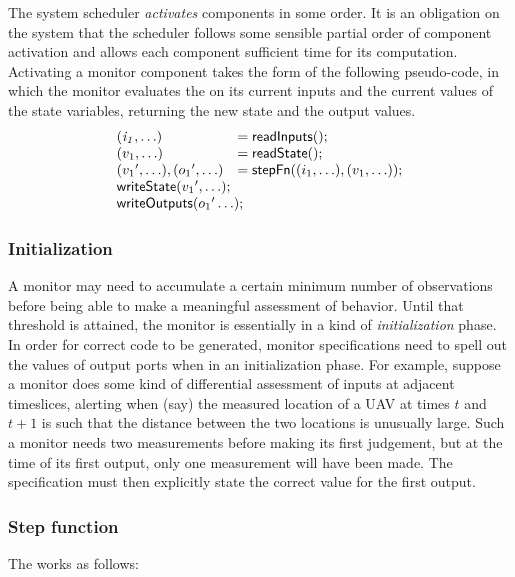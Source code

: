 The system scheduler \emph{activates} components in some order. It is
an obligation on the system that the scheduler follows some sensible
partial order of component activation and allows each component
sufficient time for its computation.  Activating a monitor component
takes the form of the following pseudo-code, in which the monitor
evaluates the  on its current inputs and the current
values of the state variables, returning the new state and the output
values.
\[
\begin{array}{ll}
 \mathit{(i_1,\ldots)} & = \konst{readInputs}(); \\
 (v_1,\ldots) & = \konst{readState}() ; \\
 ({v_1}',\ldots), ({o_1}',\ldots) & = \konst{stepFn} ((i_1,\ldots),(v_1,\ldots)) ; \\
 \multicolumn{2}{l}{\konst{writeState}({v_1}',\ldots);} \\
 \multicolumn{2}{l}{\konst{writeOutputs}({o_1}'\ldots);} \\
\end{array}
\]

\subsubsection{Initialization}

A monitor may need to accumulate a certain minimum number of
observations before being able to make a meaningful assessment of
behavior. Until that threshold is attained, the monitor is essentially
in a kind of \emph{initialization} phase. In order for correct code to
be generated, monitor specifications need to spell out the values of
output ports when in an initialization phase. For example, suppose a
monitor does some kind of differential assessment of inputs at
adjacent timeslices, alerting when (say) the measured location of a
UAV at times $t$ and $t+1$ is such that the distance between the two
locations is unusually large. Such a monitor needs two measurements
before making its first judgement, but at the time of its first
output, only one measurement will have been made. The specification
must then explicitly state the correct value for the first output.

\subsubsection{Step function}

The  works as follows:

